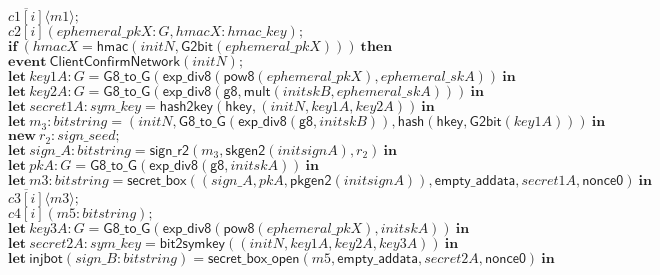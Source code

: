 \documentclass{article}
\newcommand{\cinput}[2]{{#1}({#2})}
\newcommand{\coutput}[2]{\overline{#1}\langle{#2}\rangle}
\newcommand{\kw}[1]{\mathbf{#1}}
\newcommand{\kwf}[1]{\mathsf{#1}}
\newcommand{\var}[1]{\mathit{#1}}
\newcommand{\kwt}[1]{\mathit{#1}}
\newcommand{\kwc}[1]{\mathit{#1}}
\begin{document}
\begin{tabbing}
\>$\quad \coutput{\kwc{c1}[\var{i}]}{\var{m1}};$\\
\>$\quad \cinput{\kwc{c2}[\var{i}]}{\var{ephemeral{\_}pkX}: \kwt{G}, \var{hmacX}: \kwt{hmac{\_}key}};$\\
\>$\quad \kw{if}\ (\var{hmacX}  =  \kwf{hmac}(\var{initN}, \kwf{G2bit}(\var{ephemeral{\_}pkX})))\ \kw{then}$\\
\>$\quad \kw{event}\ \kwf{ClientConfirmNetwork}(\var{initN});$\\
\>$\quad \kw{let}\ \var{key1A}: \kwt{G} = \kwf{G8{\_}to{\_}G}(\kwf{exp{\_}div8}(\kwf{pow8}(\var{ephemeral{\_}pkX}), \var{ephemeral{\_}skA}))\ \kw{in}$\\
\>$\quad \kw{let}\ \var{key2A}: \kwt{G} = \kwf{G8{\_}to{\_}G}(\kwf{exp{\_}div8}(\kwf{g8}, \kwf{mult}(\var{initskB}, \var{ephemeral{\_}skA})))\ \kw{in}$\\
\>$\quad \kw{let}\ \var{secret1A}: \kwt{sym{\_}key} = \kwf{hash2key}(\kwf{hkey}, \kwf{}(\var{initN}, \var{key1A}, \var{key2A}))\ \kw{in}$\\
\>$\quad \kw{let}\ \var{m}_{3}: \kwt{bitstring} = \kwf{}(\var{initN}, \kwf{G8{\_}to{\_}G}(\kwf{exp{\_}div8}(\kwf{g8}, \var{initskB})), \kwf{hash}(\kwf{hkey}, \kwf{G2bit}(\var{key1A})))\ \kw{in}$\\
\>$\quad \kw{new}\ \var{r}_{2}: \kwt{sign{\_}seed};$\\
\>$\quad \kw{let}\ \var{sign{\_}A}: \kwt{bitstring} = \kwf{sign{\_}r2}(\var{m}_{3}, \kwf{skgen2}(\var{initsignA}), \var{r}_{2})\ \kw{in}$\\
\>$\quad \kw{let}\ \var{pkA}: \kwt{G} = \kwf{G8{\_}to{\_}G}(\kwf{exp{\_}div8}(\kwf{g8}, \var{initskA}))\ \kw{in}$\\
\>$\quad \kw{let}\ \var{m3}: \kwt{bitstring} = \kwf{secret{\_}box}(\kwf{}(\var{sign{\_}A}, \var{pkA}, \kwf{pkgen2}(\var{initsignA})), \kwf{empty{\_}addata}, \var{secret1A}, \kwf{nonce0})\ \kw{in}$\\
\>$\quad \coutput{\kwc{c3}[\var{i}]}{\var{m3}};$\\
\>$\quad \cinput{\kwc{c4}[\var{i}]}{\var{m5}: \kwt{bitstring}};$\\
\>$\quad \kw{let}\ \var{key3A}: \kwt{G} = \kwf{G8{\_}to{\_}G}(\kwf{exp{\_}div8}(\kwf{pow8}(\var{ephemeral{\_}pkX}), \var{initskA}))\ \kw{in}$\\
\>$\quad \kw{let}\ \var{secret2A}: \kwt{sym{\_}key} = \kwf{bit2symkey}(\kwf{}(\var{initN}, \var{key1A}, \var{key2A}, \var{key3A}))\ \kw{in}$\\
\>$\quad \kw{let}\ \kwf{injbot}(\var{sign{\_}B}: \kwt{bitstring}) = \kwf{secret{\_}box{\_}open}(\var{m5}, \kwf{empty{\_}addata}, \var{secret2A}, \kwf{nonce0})\ \kw{in}$\\

\end{tabbing}
\end{document}
